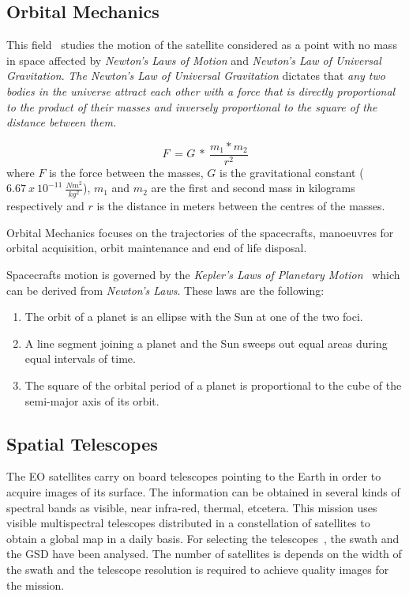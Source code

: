 \subsection{Orbital Mechanics}

This field~\cite{Braeunig2013} studies the motion of the satellite considered as a point with no
mass in space affected by \emph{Newton's Laws of Motion} and \emph{Newton's Law of
Universal Gravitation}.
\emph{The Newton's Law of Universal Gravitation} dictates that \emph{any two bodies in the
universe attract each other with a force that is directly proportional to the
product of their masses and inversely proportional to the square of the distance
between them.}

\begin{equation}
F~= G~*~{\frac {m_1*m_2}{r^2}}
\end{equation}
where $F$ is the force between the masses, $G$ is the gravitational constant
($6.67~x~10^{-11}~\frac{Nm^2}{kg^2}$), $m_1$ and $m_2$ are the first and second
mass in kilograms respectively
and $r$ is the distance in meters between the centres of the masses.

Orbital Mechanics focuses on the trajectories of the
spacecrafts, manoeuvres for orbital acquisition, orbit maintenance and end of life
disposal.

Spacecrafts motion  is governed by the \emph{Kepler's Laws of Planetary
  Motion}~\cite{Stern2014} which can be derived from \emph{Newton's Laws}. These laws are the following:
\begin{enumerate}
\item The orbit of a planet is an ellipse with the Sun at one of the two foci.
\item A line segment joining a planet and the Sun sweeps out equal areas during
  equal intervals of time.
\item The square of the orbital period of a planet is proportional to the cube
  of the semi-major axis of its orbit.
\end{enumerate}


\subsection{Spatial Telescopes}

The \ac{EO} satellites carry on board telescopes pointing to the Earth in order
to acquire images of its surface. The information can be obtained in several
kinds of spectral bands as visible, near infra-red, thermal, etcetera. This
mission uses visible multispectral telescopes distributed in a constellation of satellites
to obtain a global map in a daily basis. For selecting the telescopes~\cite{Ball2013}, the swath
and the \ac{GSD}
have been analysed. The number of satellites is depends on the width of the
swath and the telescope resolution is required to achieve quality
images for the mission.

